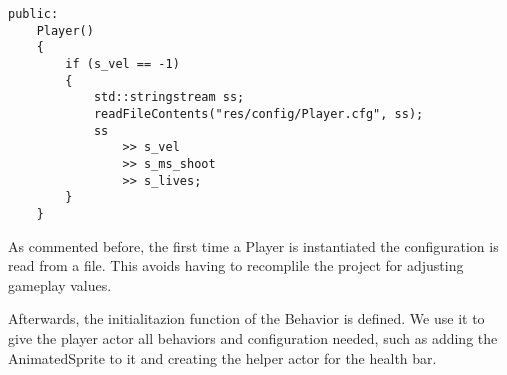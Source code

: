 \begin{lstlisting}
public:
    Player()
    {
        if (s_vel == -1)
        {
            std::stringstream ss;
            readFileContents("res/config/Player.cfg", ss);
            ss
                >> s_vel
                >> s_ms_shoot
                >> s_lives;
        }
    }
\end{lstlisting}

As commented before, the first time a Player is instantiated the configuration is read 
from a file. This avoids having to recomplile the project for adjusting gameplay values.

Afterwards, the initialitazion function of the Behavior is defined. We use it to 
give the player actor all behaviors and configuration needed, such as adding the 
AnimatedSprite to it and creating the helper actor for the health bar.

